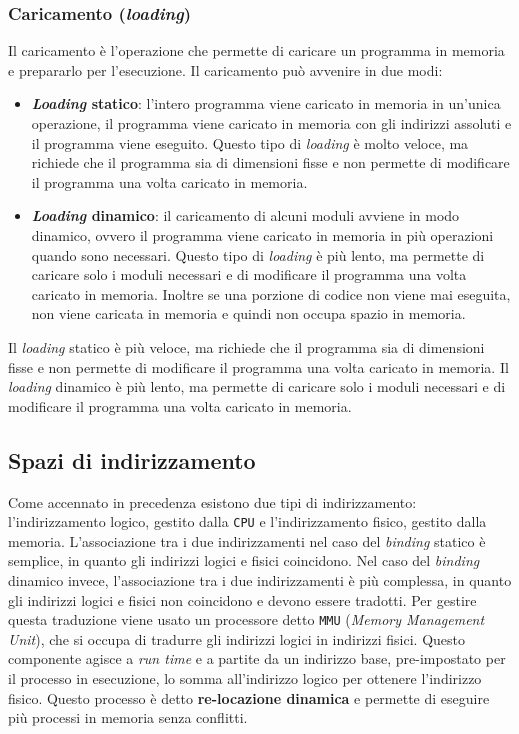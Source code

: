         \subsubsection{Caricamento (\textit{loading})}
            Il caricamento è l'operazione che permette di caricare un programma in memoria e prepararlo per l'esecuzione. Il caricamento può avvenire in due modi:
            \begin{itemize}
                \item \textbf{\textit{Loading} statico}: l'intero programma viene caricato in memoria in un'unica operazione, il programma viene caricato in memoria con gli indirizzi assoluti e il programma viene eseguito. Questo tipo di \textit{loading} è molto veloce, ma richiede che il programma sia di dimensioni fisse e non permette di modificare il programma una volta caricato in memoria.
                \item \textbf{\textit{Loading} dinamico}: il caricamento di alcuni moduli avviene in modo dinamico, ovvero il programma viene caricato in memoria in più operazioni quando sono necessari. Questo tipo di \textit{loading} è più lento, ma permette di caricare solo i moduli necessari e di modificare il programma una volta caricato in memoria. Inoltre se una porzione di codice non viene mai eseguita, non viene caricata in memoria e quindi non occupa spazio in memoria.
            \end{itemize}
            Il \textit{loading} statico è più veloce, ma richiede che il programma sia di dimensioni fisse e non permette di modificare il programma una volta caricato in memoria. Il \textit{loading} dinamico è più lento, ma permette di caricare solo i moduli necessari e di modificare il programma una volta caricato in memoria.
    \subsection{Spazi di indirizzamento}
        Come accennato in precedenza esistono due tipi di indirizzamento: l'indirizzamento logico, gestito dalla \texttt{CPU} e l'indirizzamento fisico, gestito dalla memoria. L'associazione tra i due indirizzamenti nel caso del \textit{binding} statico è semplice, in quanto gli indirizzi logici e fisici coincidono. Nel caso del \textit{binding} dinamico invece, l'associazione tra i due indirizzamenti è più complessa, in quanto gli indirizzi logici e fisici non coincidono e devono essere tradotti. Per gestire questa traduzione viene usato un processore detto \texttt{MMU} (\textit{Memory Management Unit}), che si occupa di tradurre gli indirizzi logici in indirizzi fisici. Questo componente agisce a \textit{run time} e a partite da un indirizzo base, pre-impostato per il processo in esecuzione, lo somma all'indirizzo logico per ottenere l'indirizzo fisico. Questo processo è detto \textbf{re-locazione dinamica} e permette di eseguire più processi in memoria senza conflitti.
